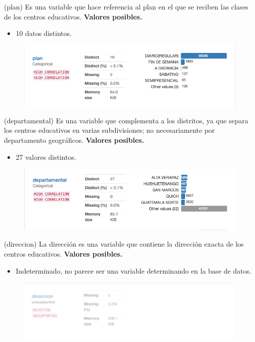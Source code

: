 
\begin{variable}(plan) 
Es una variable que hace referencia al plan en el que se reciben las clases de los centros educativos. 
\bigbreak 
\textbf{Valores posibles.}
\begin{itemize}
	\item 10 datos distintos. 
\end{itemize}
\begin{figure}[H]
	\centering
	\includegraphics[scale=0.5]{Images/14}
\end{figure}
\end{variable}


\begin{variable}(departamental) 
Es una variable que complementa a los distritos, ya que separa los centros educativos en varias subdivisiones; no necesariamente por departamento geográficos. 
\bigbreak 
\textbf{Valores posibles.}
\begin{itemize}
	\item 27 valores distintos. 
\end{itemize}
\begin{figure}[H]
	\centering
	\includegraphics[scale=0.5]{Images/15}
\end{figure}
\end{variable}


\begin{variable}(direccion) 
La dirección es una variable que contiene la dirección exacta de los centros educativos.
\bigbreak 
\textbf{Valores posibles.}
\begin{itemize}
	\item Indeterminado, no parece ser una variable determinando en la base de datos.
\end{itemize}
\begin{figure}[H]
	\centering
	\includegraphics[scale=0.5]{Images/16}
\end{figure}
\end{variable}


